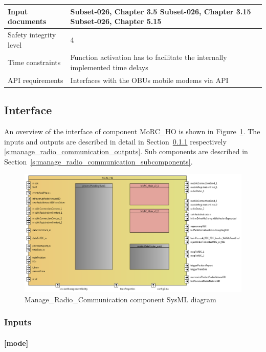 \begin{longtable}{p{}p{}}
\\
\midrule
Input documents	& 
Subset-026, Chapter 3.5 \newline
Subset-026, Chapter 3.15 \newline
Subset-026, Chapter 5.15 \\
\midrule
Safety integrity level	& 4 \\
\midrule
Time constraints		& Function activation has to facilitate the internally implemented time delays  \\
\midrule
API requirements 		& Interfaces with the OBUs mobile modems via API\\
\bottomrule
\end{longtable}


\subsection{Interface}

An overview of the interface of component MoRC\_HO is shown in Figure~\ref{f:manage_radio_communication_interface}. The inputs and outputs are described in detail in Section~\ref{s:manage_radio_communication_inputs} respectively \ref{s:manage_radio_communication_outputs}. Sub components are described in Section~\ref{s:manage_radio_communication_subcomponents}.

\begin{figure}
\center
\includegraphics[width=0.9\linewidth]{images/MoRC_HO}
\caption{Manage\_Radio\_Communication component SysML diagram}\label{f:manage_radio_communication_interface}
\end{figure}

\subsubsection{Inputs}\label{s:manage_radio_communication_inputs}

\paragraph{[mode]}

